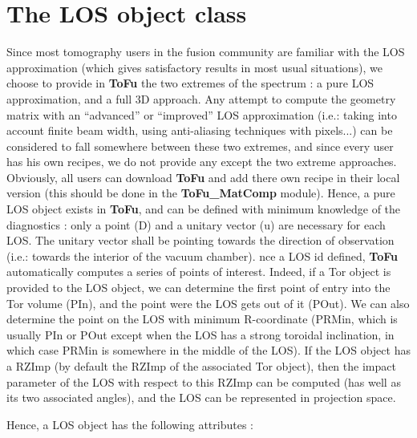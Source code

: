 \documentclass[letterpaper,10pt,english]{sphinxmanual}
\begin{document}
\chapter{The LOS object class}
\label{ToFu_Geom:the-los-object-class}
Since most tomography users in the fusion community are familiar with the LOS approximation (which gives satisfactory results in most usual situations), we choose to provide in \textbf{ToFu} the two extremes of the spectrum : a pure LOS approximation, and a full 3D approach. Any attempt to compute the geometry matrix with an ``advanced'' or ``improved'' LOS approximation (i.e.: taking into account finite beam width, using anti-aliasing techniques with pixels...) can be considered to fall somewhere between these two extremes, and since every user has his own recipes, we do not provide any except the two extreme approaches. Obviously, all users can download \textbf{ToFu} and add there own recipe in their local version (this should be done in the \textbf{ToFu\_MatComp} module). Hence, a pure LOS object exists in \textbf{ToFu}, and can be defined with minimum knowledge of the diagnostics : only a point (D) and a unitary vector (u) are necessary for each LOS. The unitary vector shall be pointing towards the direction of observation (i.e.: towards the interior of the vacuum chamber).
nce a LOS id defined, \textbf{ToFu} automatically computes a series of points of interest. Indeed, if a Tor object is provided to the LOS object, we can determine the first point of entry into the Tor volume (PIn), and the point were the LOS gets out of it (POut). We can also determine the point on the LOS with minimum R-coordinate (PRMin, which is usually PIn or POut except when the LOS has a strong toroidal inclination, in which case PRMin is somewhere in the middle of the LOS). If the LOS object has a RZImp (by default the RZImp of the associated Tor object), then the impact parameter of the LOS with respect to this RZImp can be computed (has well as its two associated angles), and the LOS can be represented in projection space.

Hence, a LOS object has the following attributes :
\end{document}
